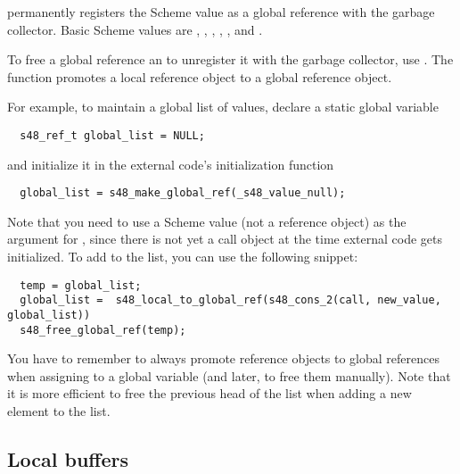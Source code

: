 \begin{protos}
\end{protos}

\noindent{} permanently registers the
Scheme value  as a global reference with the garbage
collector.  Basic Scheme values are ,
, ,
, , and
.

To free a global reference an to unregister it with the
garbage collector, use .  The function
 promotes a local reference object
to a global reference object.

For example, to maintain a global list of values, declare a static
global variable

\begin{verbatim}
  s48_ref_t global_list = NULL;
\end{verbatim}

\noindent{}and initialize it in the external code's initialization function

\begin{verbatim}
  global_list = s48_make_global_ref(_s48_value_null);
\end{verbatim}

\noindent{}Note that you need to use a Scheme value (not a reference
object) as the argument for , since there
is not yet a call object at the time external code gets initialized.
To add  to the list, you can use the following
snippet:

\begin{verbatim}
  temp = global_list;
  global_list =  s48_local_to_global_ref(s48_cons_2(call, new_value, global_list))
  s48_free_global_ref(temp);
\end{verbatim}

\noindent{}You have to remember to always promote reference objects to
global references when assigning to a global variable (and later, to
free them manually).  Note that it is more efficient to free the
previous head of the list when adding a new element to the list.

\subsection{Local buffers}
\label{sec:local-bufs}

